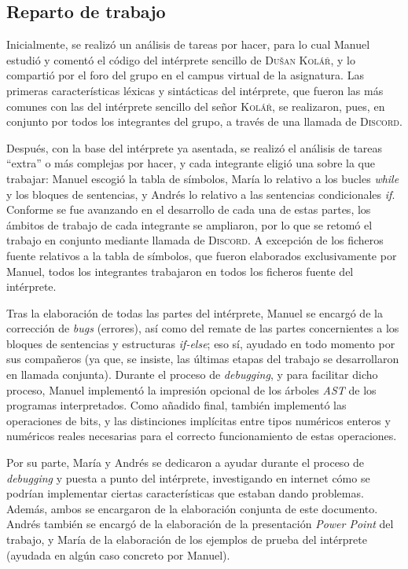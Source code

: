 \documentclass[12pt]{article}
\begin{document}
\subsection{Reparto de trabajo}
Inicialmente, se realizó un análisis de tareas por hacer, para lo cual Manuel estudió y comentó el código del intérprete sencillo de \textsc{Dušan Kolář}, y lo compartió por el foro del grupo en el campus virtual de la asignatura. Las primeras características léxicas y sintácticas del intérprete, que fueron las más comunes con las del intérprete sencillo del señor \textsc{Kolář}, se realizaron, pues, en conjunto por todos los integrantes del grupo, a través de una llamada de \textsc{Discord}.\par
Después, con la base del intérprete ya asentada, se realizó el análisis de tareas ``extra'' o más complejas por hacer, y cada integrante eligió una sobre la que trabajar: Manuel escogió la tabla de símbolos, María lo relativo a los bucles \textit{while} y los bloques de sentencias, y Andrés lo relativo a las sentencias condicionales \textit{if}. Conforme se fue avanzando en el desarrollo de cada una de estas partes, los ámbitos de trabajo de cada integrante se ampliaron, por lo que se retomó el trabajo en conjunto mediante llamada de \textsc{Discord}. A excepción de los ficheros fuente relativos a la tabla de símbolos, que fueron elaborados exclusivamente por Manuel, todos los integrantes trabajaron en todos los ficheros fuente del intérprete.\par
Tras la elaboración de todas las partes del intérprete, Manuel se encargó de la corrección de \textit{bugs} (errores), así como del remate de las partes concernientes a los bloques de sentencias y estructuras \textit{if-else}; eso sí, ayudado en todo momento por sus compañeros (ya que, se insiste, las últimas etapas del trabajo se desarrollaron en llamada conjunta). Durante el proceso de \textit{debugging}, y para facilitar dicho proceso, Manuel implementó la impresión opcional de los árboles \textit{AST} de los programas interpretados. Como añadido final, también implementó las operaciones de bits, y las distinciones implícitas entre tipos numéricos enteros y numéricos reales necesarias para el correcto funcionamiento de estas operaciones.\par
Por su parte, María y Andrés se dedicaron a ayudar durante el proceso de \textit{debugging} y puesta a punto del intérprete, investigando en internet cómo se podrían implementar ciertas características que estaban dando problemas. Además, ambos se encargaron de la elaboración conjunta de este documento. Andrés también se encargó de la elaboración de la presentación \textit{Power Point} del trabajo, y María de la elaboración de los ejemplos de prueba del intérprete (ayudada en algún caso concreto por Manuel).\par
\end{document}
